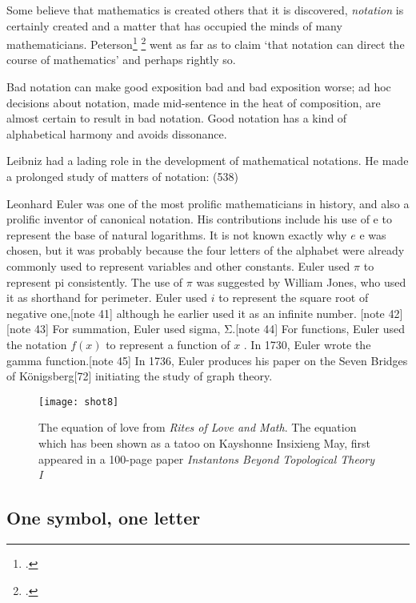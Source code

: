 {{{{Some believe that mathematics is created others that it is discovered, \emph{notation} is certainly created and
a matter that has occupied the minds of many mathematicians. Peterson\footcite{peterson2009} \footcite{peterson2009}  went as far as to claim  `that notation can direct the course of mathematics’ and perhaps rightly so.

Bad notation can make good exposition bad and bad exposition worse; ad hoc decisions about notation, made mid-sentence in the heat of composition, are almost certain to result in bad notation. Good notation has a kind of alphabetical harmony and avoids dissonance.

Leibniz had a lading role in the development of mathematical notations. He made a prolonged study of matters of notation: 
(538)

Leonhard Euler was one of the most prolific mathematicians in history, and also a prolific inventor of canonical notation. His contributions include his use of e to represent the base of natural logarithms. It is not known exactly why {$\displaystyle e$} e was chosen, but it was probably because the four letters of the alphabet were already commonly used to represent variables and other constants. Euler used {$\displaystyle \pi$ }  to represent pi consistently. The use of {$\displaystyle \pi$ }   was suggested by William Jones, who used it as shorthand for perimeter. Euler used {$\displaystyle i$}  to represent the square root of negative one,[note 41] although he earlier used it as an infinite number. [note 42][note 43] For summation, Euler used sigma, Σ.[note 44] For functions, Euler used the notation {$\displaystyle f(x)$}  to represent a function of {$\displaystyle x$} . In 1730, Euler wrote the gamma function.[note 45] In 1736, Euler produces his paper on the Seven Bridges of Königsberg[72] initiating the study of graph theory.


\begin{figure}[htbp]
\texttt{[image: shot8]}
\caption{The equation of love from \emph{Rites of Love and Math}. The equation which has been shown as a tatoo  on Kayshonne Insixieng May, first appeared in a 100-page paper \emph{Instantons Beyond Topological Theory I} \cite{frenkel2012,FLN}}
\end{figure}


\subsection{One symbol, one letter}

}}}}
